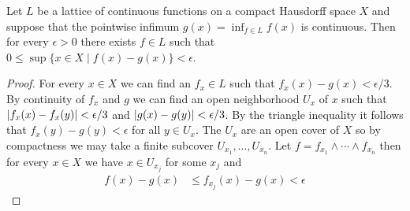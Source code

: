 \begin{lem}\label{ApproximationOfLatticeInfimum}Let $L$ be a lattice of continuous functions on a compact Hausdorff
  space $X$ and suppose that the pointwise infimum $g(x) = \inf_{f \in
    L} f(x)$ is continuous.  Then for every $\epsilon > 0$ there
  exists $f \in L$ such that $0 \leq \sup \lbrace x \in X \mid f(x) - g(x)
  \rbrace < \epsilon$.
\end{lem}
\begin{proof}
For every $x \in X$ we can find an $f_x \in L$ such that $f_x(x) - g(x) <
\epsilon/3$.  By continuity of $f_x$ and $g$ we can find an open
neighborhood  $U_x$ of $x$ such that $\left \vert f_x(x) - f_x(y) \right \vert < \epsilon/3$
and $\left \vert g(x) - g(y) \right \vert < \epsilon/3$.  By the triangle inequality it
follows that $f_x(y) - g(y) < \epsilon$ for all $y \in U_x$.  The
$U_x$ are an open cover of $X$ so by compactness we may take a finite
subcover $U_{x_1}, \dotsc, U_{x_n}$.  Let $f = f_{x_1} \wedge \cdots
\wedge f_{x_n}$ then for every $x \in X$ we have $x \in U_{x_j}$ for
some $x_j$ and 
\begin{align*}
f(x) - g(x) &\leq f_{x_j}(x) - g(x) < \epsilon
\end{align*}
\end{proof}


